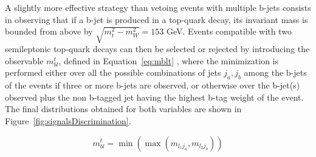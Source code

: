 \documentclass[a4paper, 10pt, openright]{report}
\begin{document}
A slightly more effective strategy than vetoing events with multiple b-jets consists in observing that if a b-jet is produced in a top-quark decay, its invariant mass is bounded from above by $\sqrt{m_t^2 - m_{W}^2} = 153$ GeV. Events compatible with two semileptonic top-quark decays can then be selected or rejected by introducing the observable $m_{bl}^t$, defined in Equation~\ref{eq:mblt} \cite{mblt}, where the minimization is performed either over all the possible combinations of jets {$j_a, j_b$} among the b-jets of the events if three or more b-jets are observed, or otherwise over the b-jet(s) observed plus the non b-tagged jet having the highest b-tag weight of the event. The final distributions obtained for both variables are shown in Figure~\ref{fig:signalsDiscrimination}.

\begin{equation}
\label{eq:mblt}
m_{bl}^t = \min \left (\max(m_{l_1 j_a}, m_{l_2 j_b}) \right)
\end{equation}
\end{document}
